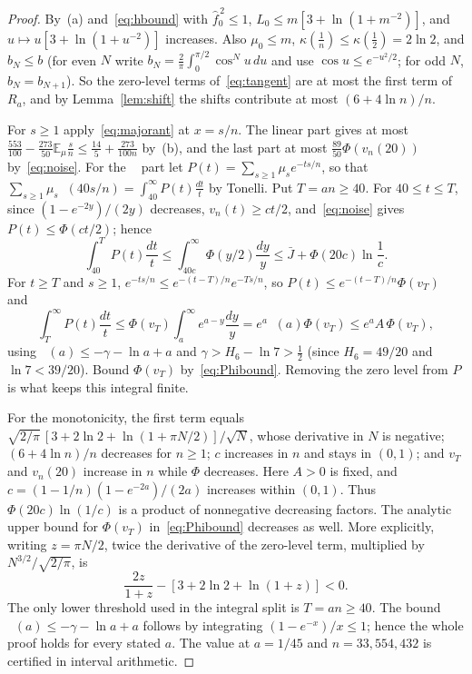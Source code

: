 \documentclass[11pt]{amsart}
\theoremstyle{definition}
\theoremstyle{remark}
\newcommand{\E}{\mathbb E}
\newcommand{\wh}[1]{\widehat{#1}}
\DeclareMathOperator{\Ei}{E_1}
\begin{document}
\begin{proof}
By~(a) and~\eqref{eq:hbound} with $\wh f_0^{\,2}\le1$, $L_0\le m[3+\ln(1+m^{-2})]$, and $u\mapsto u[3+\ln(1+u^{-2})]$ increases. Also $\mu_0\le m$, $\kappa(\frac1n)\le\kappa(\frac12)=2\ln2$, and $b_N\le b$ (for even $N$ write $b_N=\frac2\pi\int_0^{\pi/2}\cos^Nu\,du$ and use $\cos u\le e^{-u^2/2}$; for odd $N$, $b_N=b_{N+1}$). So the zero-level terms of~\eqref{eq:tangent} are at most the first term of $R_a$, and by Lemma~\ref{lem:shift} the shifts contribute at most $(6+4\ln n)/n$.

For $s\ge1$ apply~\eqref{eq:majorant} at $x=s/n$. The linear part gives at most $\frac{553}{100}-\frac{273}{50}\E_\mu\frac sn\le\frac{14}5+\frac{273}{100n}$ by~(b), and the last part at most $\frac{89}{50}\Phi(v_n(20))$ by~\eqref{eq:noise}. For the $\Ei$ part let $P(t)=\sum_{s\ge1}\mu_se^{-ts/n}$, so that $\sum_{s\ge1}\mu_s\Ei(40s/n)=\int_{40}^\infty P(t)\frac{dt}t$ by Tonelli. Put $T=an\ge40$. For $40\le t\le T$, since $(1-e^{-2y})/(2y)$ decreases, $v_n(t)\ge ct/2$, and~\eqref{eq:noise} gives $P(t)\le\Phi(ct/2)$; hence
\[
 \int_{40}^TP(t)\frac{dt}t\le\int_{40c}^\infty\Phi(y/2)\frac{dy}y\le\bar J+\Phi(20c)\ln\frac1c.
\]
For $t\ge T$ and $s\ge1$, $e^{-ts/n}\le e^{-(t-T)/n}e^{-Ts/n}$, so $P(t)\le e^{-(t-T)/n}\Phi(v_T)$ and
\[
 \int_T^\infty P(t)\frac{dt}t\le\Phi(v_T)\int_a^\infty e^{a-y}\frac{dy}y=e^a\Ei(a)\Phi(v_T)\le e^aA\,\Phi(v_T),
\]
using $\Ei(a)\le-\gamma-\ln a+a$ and $\gamma>H_6-\ln7>\frac12$ (since $H_6=49/20$ and $\ln7<39/20$). Bound $\Phi(v_T)$ by~\eqref{eq:Phibound}. Removing the zero level from $P$ is what keeps this integral finite.

For the monotonicity, the first term equals $\sqrt{2/\pi}\,[3+2\ln2+\ln(1+\pi N/2)]/\sqrt N$, whose derivative in $N$ is negative; $(6+4\ln n)/n$ decreases for $n\ge1$; $c$ increases in $n$ and stays in $(0,1)$; and $v_T$ and $v_n(20)$ increase in $n$ while $\Phi$ decreases. Here $A>0$ is fixed, and $c=(1-1/n)(1-e^{-2a})/(2a)$ increases within $(0,1)$. Thus $\Phi(20c)\ln(1/c)$ is a product of nonnegative decreasing factors. The analytic upper bound for $\Phi(v_T)$ in~\eqref{eq:Phibound} decreases as well. More explicitly, writing $z=\pi N/2$, twice the derivative of the zero-level term, multiplied by $N^{3/2}/\sqrt{2/\pi}$, is
\[
 \frac{2z}{1+z}-[3+2\ln2+\ln(1+z)]<0.
\]
The only lower threshold used in the integral split is $T=an\ge40$. The bound $\Ei(a)\le-\gamma-\ln a+a$ follows by integrating $(1-e^{-x})/x\le1$; hence the whole proof holds for every stated $a$. The value at $a=1/45$ and $n=33{,}554{,}432$ is certified in interval arithmetic.
\end{proof}
\end{document}
